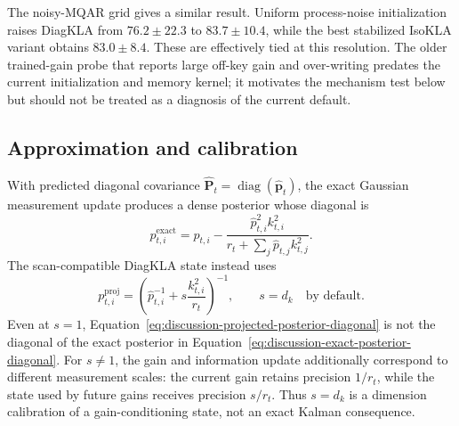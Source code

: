 \documentclass[11pt]{article}
\newcommand{\vct}[1]{\boldsymbol{#1}}
\newcommand{\diag}{\operatorname{diag}}
\begin{document}
The noisy-MQAR grid gives a similar result. Uniform process-noise initialization raises DiagKLA
from $76.2\pm22.3$ to $83.7\pm10.4$, while the best stabilized IsoKLA variant obtains
$83.0\pm8.4$. These are effectively tied at this resolution. The older trained-gain probe that
reports large off-key gain and over-writing predates the current initialization and memory
kernel; it motivates the mechanism test below but should not be treated as a diagnosis of the
current default.

\subsection{Approximation and calibration}

With predicted diagonal covariance
$\widehat{\vct{P}}_t=\diag(\widehat{\vct{p}}_t)$, the exact Gaussian measurement update produces
a dense posterior whose diagonal is
\begin{equation}
  p^{\mathrm{exact}}_{t,i}
  = \widehat p_{t,i}
  - \frac{\widehat p_{t,i}^2 k_{t,i}^2}
    {r_t+\sum_j\widehat p_{t,j}k_{t,j}^2}.
  \label{eq:discussion-exact-posterior-diagonal}
\end{equation}
The scan-compatible DiagKLA state instead uses
\begin{equation}
  p^{\mathrm{proj}}_{t,i}
  = \left(\widehat p_{t,i}^{-1}
    +s\frac{k_{t,i}^2}{r_t}\right)^{-1},
  \qquad s=d_k \quad\text{by default}.
  \label{eq:discussion-projected-posterior-diagonal}
\end{equation}
Even at $s=1$, Equation~\eqref{eq:discussion-projected-posterior-diagonal} is not the diagonal of
the exact posterior in Equation~\eqref{eq:discussion-exact-posterior-diagonal}. For $s\ne1$, the
gain and information update additionally correspond to different measurement scales: the
current gain retains precision $1/r_t$, while the state used by future gains receives precision
$s/r_t$. Thus $s=d_k$ is a dimension calibration of a gain-conditioning state, not an exact
Kalman consequence.
\end{document}
